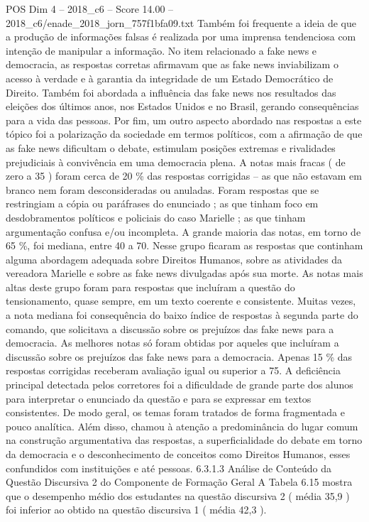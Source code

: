 \begin{textsample}{POS Dim 4 – 2018\_c6 – Score 14.00 – 2018\_c6/enade\_2018\_jorn\_757f1bfa09.txt}
Também foi frequente a ideia de que a produção de informações falsas é realizada por uma imprensa tendenciosa com intenção de manipular a informação.
No item relacionado a fake news e democracia, as respostas corretas afirmavam que as fake news inviabilizam o acesso à verdade e à garantia da integridade de um Estado Democrático de Direito.
Também foi abordada a influência das fake news nos resultados das eleições dos últimos anos, nos Estados Unidos e no Brasil, gerando consequências para a vida das pessoas.
Por fim, um outro aspecto abordado nas respostas a este tópico foi a polarização da sociedade em termos políticos, com a afirmação de que as fake news dificultam o debate, estimulam posições extremas e rivalidades prejudiciais à convivência em uma democracia plena.
A notas mais fracas ( de zero a 35 ) foram cerca de 20 \% das respostas corrigidas – as que não estavam em branco nem foram desconsideradas ou anuladas.
Foram respostas que se restringiam a cópia ou paráfrases do enunciado ; as que tinham foco em desdobramentos políticos e policiais do caso Marielle ; as que tinham argumentação confusa e/ou incompleta.
A grande maioria das notas, em torno de 65 \%, foi mediana, entre 40 a 70.
Nesse grupo ficaram as respostas que continham alguma abordagem adequada sobre Direitos Humanos, sobre as atividades da vereadora Marielle e sobre as fake news divulgadas após sua morte.
As notas mais altas deste grupo foram para respostas que incluíram a questão do tensionamento, quase sempre, em um texto coerente e consistente.
Muitas vezes, a nota mediana foi consequência do baixo índice de respostas à segunda parte do comando, que solicitava a discussão sobre os prejuízos das fake news para a democracia.
As melhores notas só foram obtidas por aqueles que incluíram a discussão sobre os prejuízos das fake news para a democracia.
Apenas 15 \% das respostas corrigidas receberam avaliação igual ou superior a 75.
A deficiência principal detectada pelos corretores foi a dificuldade de grande parte dos alunos para interpretar o enunciado da questão e para se expressar em textos consistentes.
De modo geral, os temas foram tratados de forma fragmentada e pouco analítica.
Além disso, chamou à atenção a predominância do lugar comum na construção argumentativa das respostas, a superficialidade do debate em torno da democracia e o desconhecimento de conceitos como Direitos Humanos, esses confundidos com instituições e até pessoas. 6.3.1.3 Análise de Conteúdo da Questão Discursiva 2 do Componente de Formação Geral A Tabela 6.15 mostra que o desempenho médio dos estudantes na questão discursiva 2 ( média 35,9 ) foi inferior ao obtido na questão discursiva 1 ( média 42,3 ).

\end{textsample}

